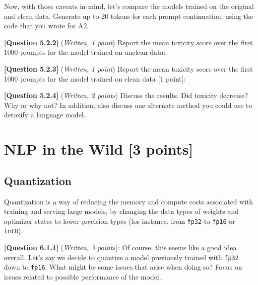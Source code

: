 \documentclass[leqno,12pt]{article}
\begin{document}
Now, with those caveats in mind, let's compare the models trained on the original and clean data. Generate up to 20 tokens for each prompt continuation, using the code that you wrote for A2.


\noindent \textbf{[Question 5.2.2]} (\emph{Written, 1 point})
Report the mean toxicity score over the first 1000 prompts for the model trained on unclean data:
\begin{tcolorbox}[fit,height=1cm, width=0.4\linewidth, blank, borderline={1pt}{-2pt}]
\end{tcolorbox}

\noindent \textbf{[Question 5.2.3]} (\emph{Written, 1 point})
Report the mean toxicity score over the first 1000 prompts for the model trained on clean data [1 point]:
\begin{tcolorbox}[fit,height=1cm, width=0.4\linewidth, blank, borderline={1pt}{-2pt}]
\end{tcolorbox}


\noindent \textbf{[Question 5.2.4]} (\emph{Written, 2 points}) Discuss the results. Did toxicity decrease? Why or why not? In addition, also discuss one alternate method you could use to detoxify a language model.

\begin{tcolorbox}[fit,height=4cm, blank, borderline={1pt}{-2pt}]
\end{tcolorbox}

\section{NLP in the Wild [3 points]}
\subsection{Quantization}

\noindent Quantization is a way of reducing the memory and compute costs associated with training and serving large models, by changing the data types of weights and optimizer states to lower-precision types (for instance, from \texttt{fp32} to \texttt{fp16} or \texttt{int8}).

\noindent \textbf{[Question 6.1.1]} (\emph{Written, 3 points}): Of course, this seems like a good idea overall. Let's say we decide to quantize a model previously trained with \texttt{fp32} down to \texttt{fp16}. What might be some issues that arise when doing so? Focus on issues related to possible performance of the model.
\begin{tcolorbox}[fit,height=4cm, width=\linewidth, blank, borderline={1pt}{-2pt}]
\end{tcolorbox}
\end{document}
